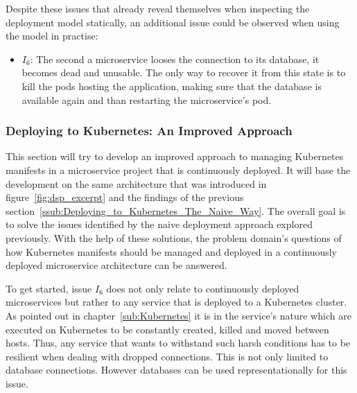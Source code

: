 Despite these issues that already reveal themselves when inspecting the
deployment model statically, an additional issue could be observed when using
the model in practise:

\begin{itemize}
  \item \textit{$I_6$}: The second a microservice looses the connection to its
    database, it becomes dead and unusable. The only way to recover it from
    this state is to kill the pods hosting the application, making sure that
    the database is available again and than restarting the microservice's pod.
\end{itemize}

\subsubsection{Deploying to Kubernetes: An Improved Approach}%
\label{ssub:Deploying_to_Kubernetes_An_Improved_Approach}

This section will try to develop an improved approach to managing Kubernetes
manifests in a microservice project that is continuously deployed. It will base
the development on the same architecture that was introduced in
figure~\ref{fig:dsp_excerpt} and the findings of the previous
section~\ref{ssub:Deploying_to_Kubernetes_The_Naive_Way}. The overall goal is
to solve the issues identified by the naive deployment approach explored
previously. With the help of these solutions, the problem domain's questions of
how Kubernetes manifests should be managed and deployed in a continuously
deployed microservice architecture can be answered.

To get started, issue $I_6$ does not only relate to continuously deployed
microservices but rather to any service that is deployed to a Kubernetes
cluster. As pointed out in chapter~\ref{sub:Kubernetes} it is in the service's
nature which are executed on Kubernetes to be constantly created, killed and
moved between hosts. Thus, any service that wants to withstand such harsh
conditions has to be resilient when dealing with dropped connections. This is
not only limited to database connections. However databases can be used
representationally for this issue.


